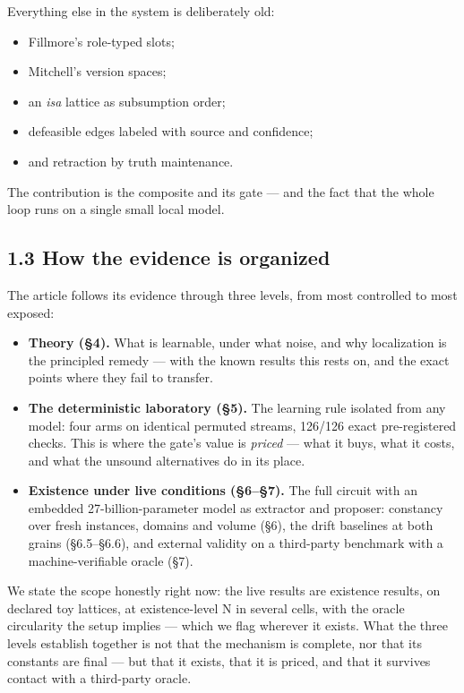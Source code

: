 \documentclass[11pt]{article}
\begin{document}
Everything else in the system is deliberately old:

\begin{itemize}
\item Fillmore's role-typed slots;
\item Mitchell's version spaces;
\item an \emph{isa} lattice as subsumption order;
\item defeasible edges labeled with source and confidence;
\item and retraction by truth maintenance.
\end{itemize}

The contribution is the composite and its gate — and the fact that the whole loop runs on a single small local model.

\subsection*{1.3 How the evidence is organized}

The article follows its evidence through three levels, from most controlled to most exposed:

\begin{itemize}
\item \textbf{Theory (§4).} What is learnable, under what noise, and why localization is the principled remedy — with the known results this rests on, and the exact points where they fail to transfer.
\item \textbf{The deterministic laboratory (§5).} The learning rule isolated from any model: four arms on identical permuted streams, 126/126 exact pre-registered checks. This is where the gate's value is \emph{priced} — what it buys, what it costs, and what the unsound alternatives do in its place.
\item \textbf{Existence under live conditions (§6–§7).} The full circuit with an embedded 27-billion-parameter model as extractor and proposer: constancy over fresh instances, domains and volume (§6), the drift baselines at both grains (§6.5–§6.6), and external validity on a third-party benchmark with a machine-verifiable oracle (§7).
\end{itemize}

We state the scope honestly right now: the live results are existence results, on declared toy lattices, at existence-level N in several cells, with the oracle circularity the setup implies — which we flag wherever it exists. What the three levels establish together is not that the mechanism is complete, nor that its constants are final — but that it exists, that it is priced, and that it survives contact with a third-party oracle.
\end{document}
